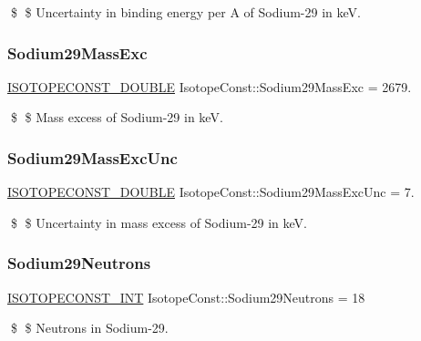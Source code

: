 \$ \$ Uncertainty in binding energy per A of Sodium-\/29 in keV. \mbox{\label{group___isotope_const-_sodium-_na29_gac44e06b2d1e717924e5ee5246999ec23}} 
\subsubsection{\texorpdfstring{Sodium29\+Mass\+Exc}{Sodium29MassExc}}
{\footnotesize\ttfamily \mbox{\hyperlink{group___isotope_const-_macros_ga8f45a7272ce02c0b4c65c44636ed719a}{I\+S\+O\+T\+O\+P\+E\+C\+O\+N\+S\+T\+\_\+\+D\+O\+U\+B\+LE}} Isotope\+Const\+::\+Sodium29\+Mass\+Exc = 2679.}

\$ \$ Mass excess of Sodium-\/29 in keV. \mbox{\label{group___isotope_const-_sodium-_na29_ga3241330c8dc7d8f2f3bc5bd97dc97d6b}} 
\subsubsection{\texorpdfstring{Sodium29\+Mass\+Exc\+Unc}{Sodium29MassExcUnc}}
{\footnotesize\ttfamily \mbox{\hyperlink{group___isotope_const-_macros_ga8f45a7272ce02c0b4c65c44636ed719a}{I\+S\+O\+T\+O\+P\+E\+C\+O\+N\+S\+T\+\_\+\+D\+O\+U\+B\+LE}} Isotope\+Const\+::\+Sodium29\+Mass\+Exc\+Unc = 7.}

\$ \$ Uncertainty in mass excess of Sodium-\/29 in keV. \mbox{\label{group___isotope_const-_sodium-_na29_ga9e1d6d311393a40aea5bc420a155dfcb}} 
\subsubsection{\texorpdfstring{Sodium29\+Neutrons}{Sodium29Neutrons}}
{\footnotesize\ttfamily \mbox{\hyperlink{group___isotope_const-_macros_ga5f18360b3e99483a35c32d789e62621c}{I\+S\+O\+T\+O\+P\+E\+C\+O\+N\+S\+T\+\_\+\+I\+NT}} Isotope\+Const\+::\+Sodium29\+Neutrons = 18}

\$ \$ Neutrons in Sodium-\/29. \mbox{\label{group___isotope_const-_sodium-_na29_gadf2d820de48ddd3c0f15404ff753c73a}} 
